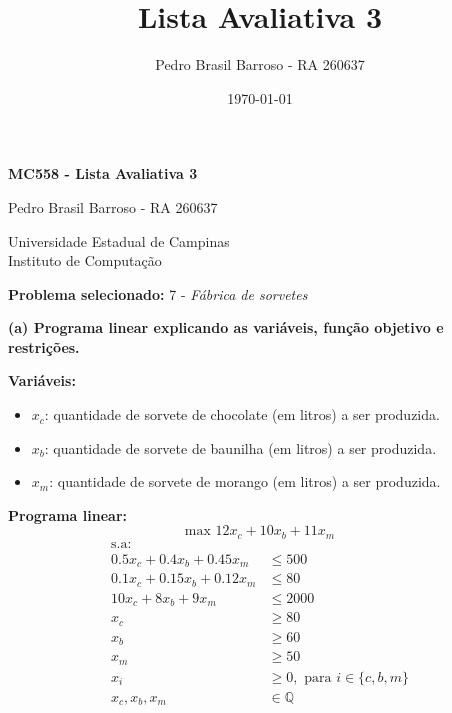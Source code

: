 \documentclass[
    12pt,
    a4paper,
    brazil,
    english
]{article}
\title{Lista Avaliativa 3}
\author{Pedro Brasil Barroso - RA 260637}
\date{\today} %
\begin{document}
\begin{titlepage}
    \centering

    \vspace*{6cm}

    {\LARGE \textbf{MC558 - Lista Avaliativa 3}}
    
    \vspace{5.5cm}
    {\Large Pedro Brasil Barroso - RA 260637}

    \vfill

    {\Large Universidade Estadual de Campinas} \\ %
    {\Large Instituto de Computação} \\

    \vspace{1cm}
\end{titlepage}

\textbf{Problema selecionado:} 7 - \textit{Fábrica de sorvetes}

\textbf{(a) Programa linear explicando as variáveis, função objetivo e restrições.}

\textbf{Variáveis:}
\begin{itemize}
    \item $x_c$: quantidade de sorvete de chocolate (em litros) a ser produzida.
    \item $x_b$: quantidade de sorvete de baunilha (em litros) a ser produzida.
    \item $x_m$: quantidade de sorvete de morango (em litros) a ser produzida.
\end{itemize}

\textbf{Programa linear:}
\begin{equation}
    \text{max } 12x_c + 10x_b + 11x_m
\end{equation}
\begin{align}
    \text{s.a:} \nonumber \\
    0.5x_c + 0.4x_b + 0.45x_m &\leq 500 \\
    0.1x_c + 0.15x_b + 0.12x_m &\leq 80 \\
    10x_c + 8x_b + 9x_m &\leq 2000 \\
    x_c &\geq 80 \\
    x_b &\geq 60 \\
    x_m &\geq 50 \\
    x_i &\geq 0, \text{ para } i \in \{c, b, m\} \\
    x_c, x_b, x_m &\in \mathbb{Q}
\end{align}
\end{document}
